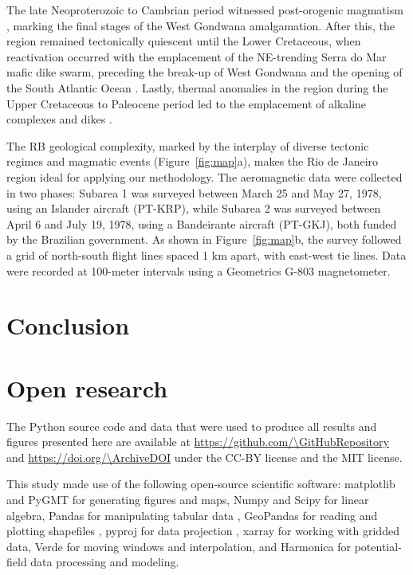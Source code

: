The late Neoproterozoic to Cambrian period witnessed post-orogenic magmatism
\citep[\textit{e.g.,}][]{Valeriano2011}, marking the final stages of the West
Gondwana amalgamation. After this, the region remained tectonically quiescent
until the Lower Cretaceous, when reactivation occurred with the emplacement of
the NE-trending Serra do Mar mafic dike swarm, preceding the break-up of West
Gondwana and the opening of the South Atlantic Ocean \citep{Almeida2013}.
Lastly, thermal anomalies in the region during the Upper Cretaceous to
Paleocene period led to the emplacement of alkaline complexes and dikes
\citep{Thompson1998}.

The RB geological complexity, marked by the interplay of diverse tectonic
regimes and magmatic events (Figure~\ref{fig:map}a), makes the Rio de Janeiro
region ideal for applying our methodology. The aeromagnetic data were collected
in two phases: Subarea 1 was surveyed between March 25 and May 27, 1978, using
an Islander aircraft (PT-KRP), while Subarea 2 was surveyed between April 6 and
July 19, 1978, using a Bandeirante aircraft (PT-GKJ), both funded by the
Brazilian government. As shown in Figure~\ref{fig:map}b, the survey followed
a grid of north-south flight lines spaced 1 km apart, with east-west tie lines.
Data were recorded at 100-meter intervals using a Geometrics G-803
magnetometer.


\section{Conclusion}



\section{Open research}

The Python source code and data that were used to produce all results and
figures presented here are available at
\url{https://github.com/\GitHubRepository}
and \url{https://doi.org/\ArchiveDOI} \citep{figshare}
under the CC-BY license and the MIT license.

This study made use of the following open-source scientific software:
matplotlib \citep{matplotlib} and PyGMT \citep{pygmt} for generating figures
and maps,
Numpy \citep{numpy} and Scipy \citep{scipy} for linear algebra,
Pandas for manipulating tabular data \citep{McKinney2010,pandas},
GeoPandas for reading and plotting shapefiles \citep{geopandas},
pyproj for data projection \citep{pyproj},
xarray \citep{xarray} for working with gridded data,
Verde \citep{verde} for moving windows and interpolation,
and
Harmonica \citep{harmonica} for potential-field data processing and modeling.

